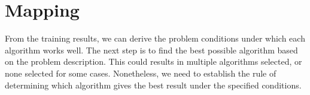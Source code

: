 \section{Mapping}
From the training results, we can derive the problem conditions under which each algorithm works well. The next step is to find the best possible algorithm based on the problem description. This could results in multiple algorithms selected, or none selected for some cases. Nonetheless, we need to establish the rule of determining which algorithm gives the best result under the specified conditions.


